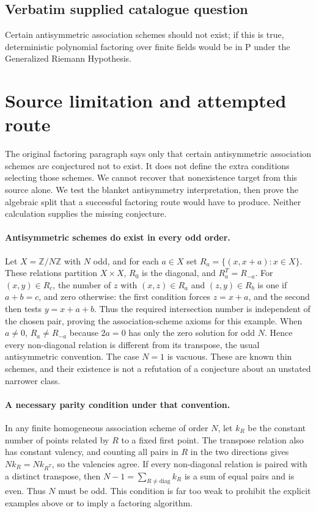 \documentclass[11pt]{article}
\begin{document}
\subsection{Verbatim supplied catalogue question}
Certain antisymmetric association schemes should not exist; if this is true, deterministic polynomial factoring over finite fields would be in $\mathrm{P}$ under the Generalized Riemann Hypothesis.

\section{Source limitation and attempted route}
The original factoring paragraph says only that certain antisymmetric
association schemes are conjectured not to exist. It does not define the
extra conditions selecting those schemes. We cannot recover that nonexistence
target from this source alone. We test the blanket antisymmetry interpretation,
then prove the algebraic split that a successful factoring route would have
to produce. Neither calculation supplies the missing conjecture.

\paragraph{Antisymmetric schemes do exist in every odd order.}
Let $X=\mathbb Z/N\mathbb Z$ with $N$ odd, and for each $a\in X$ set
$R_a=\{(x,x+a):x\in X\}$. These relations partition $X\times X$,
$R_0$ is the diagonal, and $R_a^T=R_{-a}$.
For $(x,y)\in R_c$, the number of $z$ with $(x,z)\in R_a$ and
$(z,y)\in R_b$ is one if $a+b=c$, and zero otherwise: the first condition
forces $z=x+a$, and the second then tests $y=x+a+b$.
Thus the required intersection number is independent of the chosen pair,
proving the association-scheme axioms for this example. When $a\ne0$,
$R_a\ne R_{-a}$ because $2a=0$ has only the zero solution for odd $N$.
Hence every non-diagonal relation is different from its transpose, the usual
antisymmetric convention. The case $N=1$ is vacuous. These are known thin
schemes, and their existence is not a refutation of a conjecture about an
unstated narrower class.

\paragraph{A necessary parity condition under that convention.}
In any finite homogeneous association scheme of order $N$, let $k_R$ be the
constant number of points related by $R$ to a fixed first point.
The transpose relation also has constant valency, and counting all pairs in
$R$ in the two directions gives $Nk_R=Nk_{R^T}$, so the valencies agree.
If every non-diagonal relation is paired with a distinct transpose, then
$N-1=\sum_{R\ne\mathrm{diag}}k_R$ is a sum of equal pairs and is even.
Thus $N$ must be odd. This condition is far too weak to prohibit the explicit
examples above or to imply a factoring algorithm.
\end{document}
